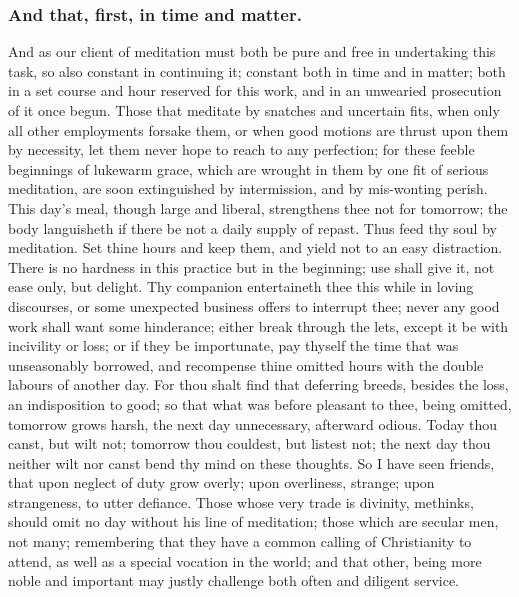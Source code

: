 \subsubsection{And that, first, in time and matter.}
And as our client of meditation must both be pure and free in undertaking this task, so also constant in continuing it; constant both in time and in matter; both in a set course and hour reserved for this work, and in an unwearied prosecution of it once begun. Those that meditate by snatches and uncertain fits, when only all other employments forsake them, or when good motions are thrust upon them by necessity, let them never hope to reach to any perfection; for these feeble beginnings of lukewarm grace, which are wrought in them by one fit of serious meditation, are soon extinguished by intermission, and by mis-wonting perish. This day's meal, though large and liberal, strengthens thee not for tomorrow; the body languisheth if there be not a daily supply of repast. Thus feed thy soul by meditation. Set thine hours and keep them, and yield not to an easy distraction. There is no hardness in this practice but in the beginning; use shall give it, not ease only, but delight. Thy companion entertaineth thee this while in loving discourses, or some unexpected business offers to interrupt thee; never any good work shall want some hinderance; either break through the lets, except it be with incivility or loss; or if they be importunate, pay thyself the time that was unseasonably borrowed, and recompense thine omitted hours with the double labours of another day. For thou shalt find that deferring breeds, besides the loss, an indisposition to good; so that what was before pleasant to thee, being omitted, tomorrow grows harsh, the next day unnecessary, afterward odious. Today thou canst, but wilt not; tomorrow thou couldest, but listest not; the next day thou neither wilt nor canst bend thy mind on these thoughts. So I have seen friends, that upon neglect of duty grow overly; upon overliness, strange; upon strangeness, to utter defiance. Those whose very trade is divinity, methinks, should omit no day without his line of meditation; those which are secular men, not many; remembering that they have a common calling of Christianity to attend, as well as a special vocation in the world; and that other, being more noble and important may justly challenge both often and diligent service. 


